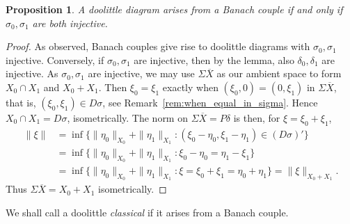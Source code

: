 \documentclass[a4paper,11pt]{article}
\theoremstyle{plain}
\newtheorem{proposition}{Proposition}[section]
\theoremstyle{remark}
\begin{document}
\begin{proposition}\label{prop:when_couple}
A doolittle diagram arises from a Banach couple if and only if $\sigma_0,\sigma_1$ are both injective.
\end{proposition}
\begin{proof}
As observed, Banach couples give rise to doolittle diagrams with $\sigma_0,\sigma_1$ injective.  Conversely, if $\sigma_0,\sigma_1$ are injective, then by the lemma, also $\delta_0,\delta_1$ are injective.  As $\sigma_0,\sigma_1$ are injective, we may use $\Sigma\overline X$ as our ambient space to form $X_0\cap X_1$ and $X_0 + X_1$.  Then $\xi_0 = \xi_1$ exactly when $(\xi_0,0) = (0,\xi_1)$ in $\Sigma\overline X$, that is, $(\xi_0,\xi_1) \in D\sigma$, see Remark~\ref{rem:when_equal_in_sigma}.  Hence $X_0 \cap X_1 = D\sigma$, isometrically.  The norm on $\Sigma\overline X = P\delta$ is then, for $\xi = \xi_0+\xi_1$,
\begin{align*}
\|\xi\| &= \inf\{ \|\eta_0\|_{X_0} + \|\eta_1\|_{X_1} : (\xi_0-\eta_0, \xi_1-\eta_1) \in (D\sigma)' \} \\
&= \inf\{ \|\eta_0\|_{X_0} + \|\eta_1\|_{X_1} : \xi_0-\eta_0 = \eta_1-\xi_1 \} \\
&= \inf\{ \|\eta_0\|_{X_0} + \|\eta_1\|_{X_1} : \xi = \xi_0 + \xi_1 = \eta_0 + \eta_1 \}
= \|\xi\|_{X_0 + X_1}.
\end{align*}
Thus $\Sigma\overline X = X_0+X_1$ isometrically.
\end{proof}

We shall call a doolittle \emph{classical} if it arises from a Banach couple.
\end{document}
